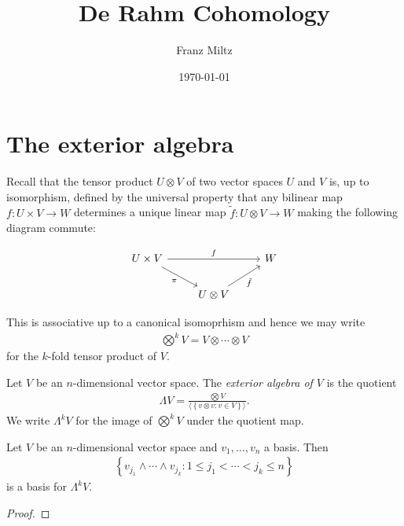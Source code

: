 \documentclass{article}
\begin{document}
\title{De Rahm Cohomology}
\author{Franz Miltz}
\date{\today}
\maketitle


\section{The exterior algebra}

Recall that the tensor product $U\otimes V$ of two vector spaces $U$ and $V$ is, up to isomorphism, defined by the universal property that any bilinear map $f:U\times V\to W$ determines a unique linear map $\tilde f : U\otimes V\to W$ making the following diagram commute:

\begin{equation*}
  \begin{tikzcd}
    {U\times V} && W \\
                & {U\otimes V}
                \arrow["f", from=1-1, to=1-3]
                \arrow["{\tilde f}"', from=2-2, to=1-3]
                \arrow["\pi"', from=1-1, to=2-2]
  \end{tikzcd}
\end{equation*}

This is associative up to a canonical isomoprhism and hence we may write
\begin{align*}
  \bigotimes^k V = V \otimes \cdots \otimes V
\end{align*}
for the $k$-fold tensor product of $V$.

\begin{definition}
  Let $V$ be an $n$-dimensional vector space. The \emph{exterior algebra of
  $V$} is the quotient
  \begin{align*}
    \Lambda V = \frac{\bigotimes V}{\langle\left\lbrace{v\otimes v : v \in V}\right\rbrace\rangle}.
  \end{align*}
  We write $\Lambda^k V$ for the image of $\bigotimes^k V$ under the quotient
  map.
\end{definition}

\begin{lemma}
  Let $V$ be an $n$-dimensional vector space and $v_1,\ldots,v_n$ a basis.
  Then
  \begin{align*}
    \left\lbrace{v_{j_1}\wedge\cdots\wedge v_{j_k} : 1\leq j_1<\cdots<j_k\leq n }\right\rbrace
  \end{align*}
  is a basis for $\Lambda^k V$.
  \begin{proof}
  \end{proof}
\end{lemma}
\end{document}
